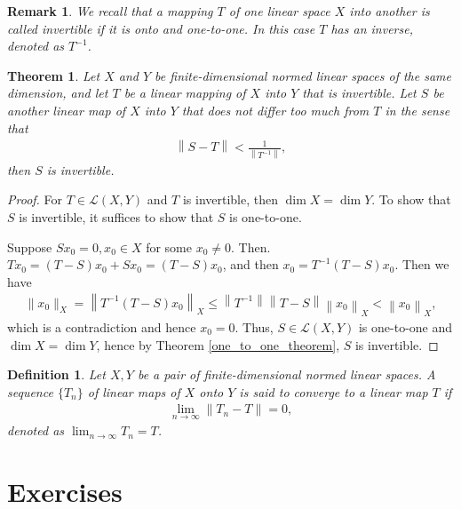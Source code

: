 \documentclass[11pt]{book}
\newtheorem{definition}{Definition}[chapter]
\newtheorem{theorem}{Theorem}[chapter]
\newtheorem{remark}{Remark}[chapter]
\theoremstyle{definition}
\numberwithin{equation}{chapter}
\begin{document}
\begin{remark}
We recall that a mapping $T$ of one linear space $X$ into another is called invertible if it is onto and one-to-one. In this case $T$ has an inverse, denoted as $T^{-1}$.
\end{remark}

\medskip

\begin{theorem}
Let $X$ and $Y$ be finite-dimensional normed linear spaces of the same dimension, and let $T$ be a linear mapping of $X$ into $Y$ that is invertible. Let $S$ be another linear map of $X$ into $Y$ that does not differ too much from $T$ in the sense that
\begin{align*}
    \left\|S - T\right\| < \frac{1}{\left\|T^{-1}\right\|},
\end{align*}
then $S$ is invertible.
\end{theorem}
\begin{proof}
For $T \in \mathscr{L}(X, Y)$ and $T$ is invertible, then $\dim X = \dim Y$. To show that $S$ is invertible, it suffices to show that $S$ is one-to-one.

Suppose $Sx_0 = 0, x_0 \in X$ for some $x_0 \neq 0$. Then. $Tx_0 = (T - S)x_0 + Sx_0 = (T - S)x_0$, and then $x_0 = T^{-1} (T - S)x_0$. Then we have
\begin{align*}
    \|x_0\|_X = \left\|T^{-1}(T - S)x_0\right\|_X \leq \left\|T^{-1}\right\| \left\|T - S\right\| \left\| x_0\right\|_X < \left\| x_0\right\|_X,
\end{align*}
which is a contradiction and hence $x_0 = 0$. Thus, $S \in \mathscr{L}(X,Y)$ is one-to-one and $\dim X = \dim Y$, hence by Theorem \ref{one_to_one_theorem}, $S$ is invertible.
\end{proof}

\medskip

\begin{definition}
Let $X, Y$ be a pair of finite-dimensional normed linear spaces. A sequence $\{T_n\}$ of linear maps of $X$ onto $Y$ is said to converge to a linear map $T$ if 
\begin{align*}
    \lim_{n \to \infty} \left\|T_n - T\right\| = 0,
\end{align*}
denoted as $\lim_{n \to \infty} T_n = T$.
\end{definition}










\chapter{Exercises}
\end{document}
